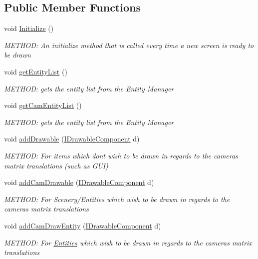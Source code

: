 \subsection*{Public Member Functions}
\begin{DoxyCompactItemize}
\item 
void \hyperlink{a00458_ab1282efae383e9024233a2fc1eb7577b}{Initialize} ()
\begin{DoxyCompactList}\small\item\em M\+E\+T\+H\+OD\+: An initialize method that is called every time a new screen is ready to be drawn \end{DoxyCompactList}\item 
void \hyperlink{a00458_a48c8e64f7e597fdea8412057d24bcb3d}{get\+Entity\+List} ()
\begin{DoxyCompactList}\small\item\em M\+E\+T\+H\+OD\+: gets the entity list from the Entity Manager \end{DoxyCompactList}\item 
void \hyperlink{a00458_a37f1fdeb82edc4e414404d43d1c6bb51}{get\+Cam\+Entity\+List} ()
\begin{DoxyCompactList}\small\item\em M\+E\+T\+H\+OD\+: gets the entity list from the Entity Manager \end{DoxyCompactList}\item 
void \hyperlink{a00458_a3beadf9574678e62c968c8631b367348}{add\+Drawable} (\hyperlink{a00454}{I\+Drawable\+Component} d)
\begin{DoxyCompactList}\small\item\em M\+E\+T\+H\+OD\+: For items which dont wish to be drawn in regards to the cameras matrix translations (such as G\+UI) \end{DoxyCompactList}\item 
void \hyperlink{a00458_a85d74d22976a3d818b21cc856da85092}{add\+Cam\+Drawable} (\hyperlink{a00454}{I\+Drawable\+Component} d)
\begin{DoxyCompactList}\small\item\em M\+E\+T\+H\+OD\+: For Scenery/\+Entities which wish to be drawn in regards to the cameras matrix translations \end{DoxyCompactList}\item 
void \hyperlink{a00458_a5ce82555229026255b46d824edc679e8}{add\+Cam\+Draw\+Entity} (\hyperlink{a00454}{I\+Drawable\+Component} d)
\begin{DoxyCompactList}\small\item\em M\+E\+T\+H\+OD\+: For \hyperlink{a00259}{Entities} which wish to be drawn in regards to the cameras matrix translations \end{DoxyCompactList}\item 

\end{DoxyCompactItemize}
